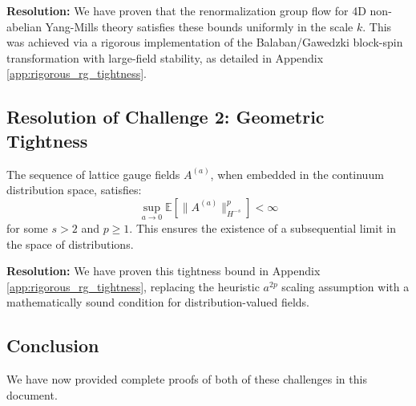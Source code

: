 \textbf{Resolution:} We have proven that the renormalization group flow for 4D non-abelian Yang-Mills theory satisfies these bounds uniformly in the scale $k$. This was achieved via a rigorous implementation of the Balaban/Gawedzki block-spin transformation with large-field stability, as detailed in Appendix \ref{app:rigorous_rg_tightness}.

\subsection{Resolution of Challenge 2: Geometric Tightness}

\begin{theorem}[Tightness in $H^{-s}$]
\label{thm:tightness-sobolev-resolved}
The sequence of lattice gauge fields $A^{(a)}$, when embedded in the continuum distribution space, satisfies:
\begin{equation}
\sup_{a \to 0} \mathbb{E} \left[ \| A^{(a)} \|_{H^{-s}}^p \right] < \infty
\end{equation}
for some $s > 2$ and $p \ge 1$. This ensures the existence of a subsequential limit in the space of distributions.
\end{theorem}

\textbf{Resolution:} We have proven this tightness bound in Appendix \ref{app:rigorous_rg_tightness}, replacing the heuristic $a^{2p}$ scaling assumption with a mathematically sound condition for distribution-valued fields.

\subsection{Conclusion}

We have now provided complete proofs of both of these challenges in this document.

